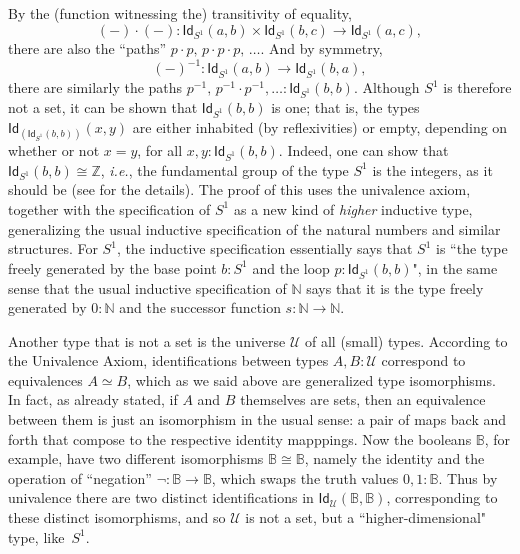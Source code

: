 \documentclass[11pt]{article}
\newcommand{\B}{\ensuremath{\mathbb{B}}}
\newcommand{\N}{\ensuremath{\mathbb{N}}}
\newcommand{\Id}{\mathsf{Id}}
\newcommand{\id}[1]{\Id_{#1}}
\newcommand{\U}{\ensuremath{\mathcal{U}}}
\theoremstyle{remark}
\theoremstyle{definition}
\begin{document}
By the (function witnessing the) transitivity of equality, 
\[
(-)\cdot(-) : \id{S^1}(a,b) \times \id{S^1}(b,c)\to \id{S^1}(a,c),
\]
 there are also the ``paths'' $p\cdot p,\, p\cdot p\cdot p,\, \ldots$.   And by symmetry,
 \[
 (-)^{-1}:\id{S^1}(a,b) \to \id{S^1}(b,a),
 \]
 there are similarly the paths $p^{-1},\, p^{-1}\cdot p^{-1}, \ldots :\id{S^1}(b,b)$.  Although $S^1$ is therefore not a set, it can be shown that $\id{S^1}(b,b)$ is one; that is, the types $\id{\left(\id{S^1}(b,b)\right)}(x,y)$ are either inhabited (by reflexivities) or empty, depending on whether or not $x=y$, for all $x,y : \id{S^1}(b,b)$.  Indeed, one can show that $\id{S^1}(b,b) \cong \mathbb{Z}$, \textit{i.e.}, the fundamental group of the type $S^1$ is the integers, as it should be (see \cite{LS-Circ} for the details).  
The proof of this uses the univalence axiom, together with the specification of $S^1$ as a new kind of \emph{higher} inductive type, generalizing the usual inductive specification of the natural numbers and similar structures.  For $S^1$, the inductive specification essentially says that $S^1$ is ``the type freely generated by the base point $b:S^1$ and the loop $p:\id{S^1}(b,b)$", in the same sense that the usual inductive specification of $\N$ says that it is the type freely generated by $0:\N$ and the successor function $s:\N\to\N$.  
  
Another type that is not a set is the universe $\U$ of all (small) types.  According to the Univalence Axiom, identifications between types $A,B:\U$ correspond to equivalences $A\simeq B$, which as we said above are generalized type isomorphisms.  In fact, as already stated, if $A$ and $B$ themselves are sets, then an equivalence between them is just an isomorphism in the usual sense: a pair of maps back and forth that compose to the respective identity mapppings.  Now the booleans $\B$, for example, have two different isomorphisms $\B\cong \B$, namely the identity and the operation of ``negation'' $\neg:\B\to\B$, which swaps the truth values $0,1:\B$.  Thus by univalence there are two distinct identifications in $\id{\U}(\B,\B)$, corresponding to these distinct isomorphisms, and so $\U$ is not a set, but a ``higher-dimensional" type, like~$S^1$.  
 
\end{document}
